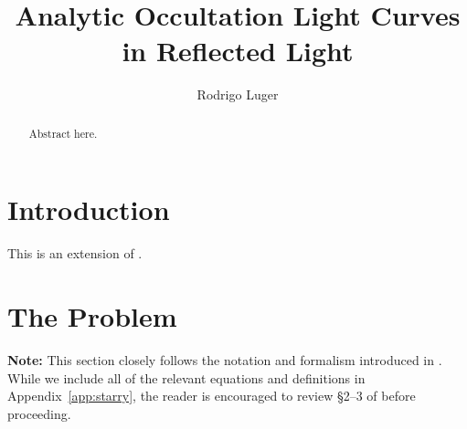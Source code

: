 \documentclass[modern]{aastex62}
\begin{document}
\title{Analytic Occultation Light Curves in Reflected Light}

\author[0000-0002-0296-3826]{Rodrigo Luger}
%

\begin{abstract}
    Abstract here.
    \href{https://github.com/rodluger/starrynight}{\color{linkcolor}\faGithub}
\end{abstract}

%
\section{Introduction}
\label{sec:intro}
%
This is an extension of \citet{Luger2019}.

%
\section{The Problem}
\label{sec:the-problem}
%
\textbf{Note:}
This section closely follows the
notation and formalism introduced in \citet{Luger2019}. While we
include all of the relevant equations and definitions in
Appendix~\ref{app:starry}, the reader is encouraged to
review \S2--3 of \citet{Luger2019} before proceeding.

\end{document}
